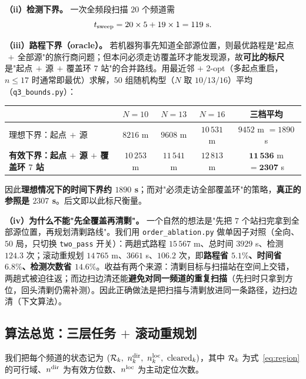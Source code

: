 \noindent\textbf{（ii）检测下界。} 一次全频段扫描 $20$ 个频道需
\begin{equation}
t_{\rm sweep}=20\times5+19\times1=119\ \text{s}.
\end{equation}

\noindent\textbf{（iii）路程下界（oracle）。} 若机器狗事先知道全部源位置，则最优路程是"起点$\,+\,$全部源"的旅行商问题；但本问必须走访覆盖环才能发现源，故\textbf{可比的标尺}是"起点$\,+\,$源$\,+\,$覆盖环 $7$ 站"的合并路线。用最近邻 $+$ 2-opt（多起点重启，$n\le17$ 时通常即最优）求解，$50$ 组随机构型（$N$ 取 $10/13/16$）平均（\texttt{q3\_bounds.py}）：

\begin{center}
\small
\setlength{\tabcolsep}{5pt}
\begin{tabular}{lccc@{\qquad}c}
\toprule
& $N=10$ & $N=13$ & $N=16$ & 三档平均 \\
\midrule
理想下界：起点$\,+\,$源 & $8216$ m & $9608$ m & $10\,531$ m & $9452$ m $=1890$ s \\
\textbf{有效下界：起点$\,+\,$源$\,+\,$覆盖环 $7$ 站} & $10\,253$ m & $11\,541$ m & $12\,813$ m & $\bm{11\,536}$ m $\bm{=2307}$ s \\
\bottomrule
\end{tabular}
\end{center}

因此\textbf{理想情况下的时间下界约 $1890$ s}；而对"必须走访全部覆盖环"的策略，\textbf{真正的参照是 $2307$ s}。后文即以此标尺衡量。

\noindent\textbf{（iv）为什么不能"先全覆盖再清剿"。} 一个自然的想法是"先把 $7$ 个站扫完拿到全部源位置，再规划清剿路线"。我们用 \texttt{order\_ablation.py} 做单因子对照（全向、$50$ 局，只切换 \texttt{two\_pass} 开关）：两趟式路程 $15\,567$ m、总时间 $3929$ s、检测 $124.3$ 次；滚动重规划 $14\,765$ m、$3661$ s、$106.2$ 次，即\textbf{路程省 $5.1\%$、时间省 $6.8\%$、检测次数省 $14.6\%$}。收益有两个来源：清剿目标与扫描站在空间上交错，两趟式被迫往返；而边扫边清还能\textbf{避免对同一频道的重复扫描}（先扫时只拿到方位，回头清剿仍需补测）。因此正确做法是把扫描与清剿放进同一条路径，边扫边清（下文算法）。

\subsection{\texorpdfstring{算法总览：三层任务 $+$ 滚动重规划}{算法总览：三层任务 + 滚动重规划}}

我们把每个频道的状态记为 $(\Reg_k,\ n_k^{\rm dir},\ n_k^{\rm loc},\ \text{cleared}_k)$，其中 $\mathcal{R}_k$ 为式~\eqref{eq:region} 的可行域、$n^{\rm dir}$ 为有效方位数、$n^{\rm loc}$ 为主动定位次数。

